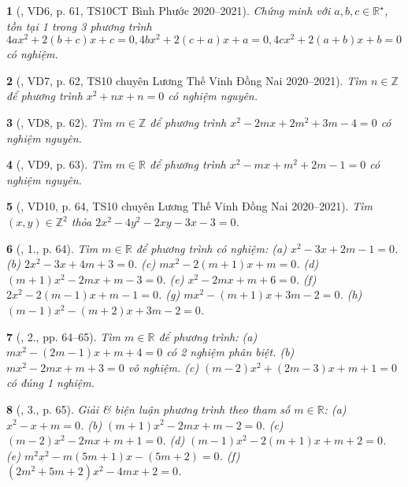 \documentclass{article}
\newtheorem{baitoan}{}
\begin{document}
\begin{baitoan}[\cite{Thu_Viet_Minh_ptb2}, VD6, p. 61, TS10CT Bình Phước 2020--2021]
	Chứng minh với $a,b,c\in\mathbb{R}^\star$, tồn tại 1 trong 3 phương trình $4ax^2 + 2(b + c)x + c = 0,4bx^2 + 2(c + a)x + a = 0,4cx^2 + 2(a + b)x + b = 0$ có nghiệm.
\end{baitoan}

\begin{baitoan}[\cite{Thu_Viet_Minh_ptb2}, VD7, p. 62, TS10 chuyên Lương Thế Vinh Đồng Nai 2020--2021]
	Tìm $n\in\mathbb{Z}$ để phương trình $x^2 + nx + n = 0$ có nghiệm nguyên.
\end{baitoan}

\begin{baitoan}[\cite{Thu_Viet_Minh_ptb2}, VD8, p. 62]
	Tìm $m\in\mathbb{Z}$ để phương trình $x^2 - 2mx + 2m^2 + 3m - 4 = 0$ có nghiệm nguyên.
\end{baitoan}

\begin{baitoan}[\cite{Thu_Viet_Minh_ptb2}, VD9, p. 63]
	Tìm $m\in\mathbb{R}$ để phương trình $x^2 - mx + m^2 + 2m - 1 = 0$ có nghiệm nguyên.
\end{baitoan}

\begin{baitoan}[\cite{Thu_Viet_Minh_ptb2}, VD10, p. 64,  TS10 chuyên Lương Thế Vinh Đồng Nai 2020--2021]
	Tìm $(x,y)\in\mathbb{Z}^2$ thỏa $2x^2 - 4y^2 - 2xy - 3x - 3 = 0$.
\end{baitoan}

\begin{baitoan}[\cite{Thu_Viet_Minh_ptb2}, 1., p. 64]
	Tìm $m\in\mathbb{R}$ để phương trình có nghiệm: (a) $x^2 - 3x + 2m - 1 = 0$. (b) $2x^2 - 3x + 4m + 3 = 0$. (c) $mx^2 - 2(m + 1)x + m = 0$. (d) $(m + 1)x^2 - 2mx + m - 3 = 0$. (e) $x^2 - 2mx + m + 6 = 0$. (f) $2x^2 - 2(m - 1)x + m - 1 = 0$. (g) $mx^2 - (m + 1)x + 3m - 2 = 0$. (h) $(m - 1)x^2 - (m + 2)x + 3m - 2 = 0$.
\end{baitoan}

\begin{baitoan}[\cite{Thu_Viet_Minh_ptb2}, 2., pp. 64--65]
	Tìm $m\in\mathbb{R}$ để phương trình: (a) $mx^2 - (2m - 1)x + m + 4 = 0$ có 2 nghiệm phân biệt. (b) $mx^2 - 2mx + m + 3 = 0$ vô nghiệm. (c) $(m - 2)x^2 + (2m - 3)x + m + 1 = 0$ có đúng 1 nghiệm.
\end{baitoan}

\begin{baitoan}[\cite{Thu_Viet_Minh_ptb2}, 3., p. 65]
	Giải \& biện luận phương trình theo tham số $m\in\mathbb{R}$: (a) $x^2 - x + m = 0$. (b) $(m + 1)x^2 - 2mx + m - 2 = 0$. (c) $(m - 2)x^2 - 2mx + m + 1 = 0$. (d) $(m - 1)x^2 - 2(m + 1)x + m + 2 = 0$. (e) $m^2x^2 - m(5m + 1)x - (5m + 2) = 0$. (f) $(2m^2 + 5m + 2)x^2 - 4mx + 2 = 0$.
\end{baitoan}
\end{document}
